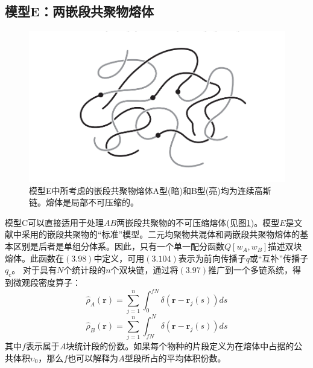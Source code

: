 \subsection{模型E：两嵌段共聚物熔体}

\begin{figure}[H]
	\centering   
	\includegraphics[width=12cm]{./figures/2.png}
	\caption{模型E中所考虑的嵌段共聚物熔体A型(暗)和B型(亮)均为连续高斯链。熔体是局部不可压缩的。}
	\label{模型E}
\end{figure}
模型C可以直接适用于处理$AB$两嵌段共聚物的不可压缩熔体(见图\ref{模型E})。模型$E$是文献中采用的嵌段共聚物的“标准”模型。二元均聚物共混体和两嵌段共聚物熔体的基本区别是后者是单组分体系。因此，只有一个单一配分函数$Q[w_{A},w_{B}]$描述双块熔体。此函数在$(3.98)$中定义，可用$(3.104)$表示为前向传播子$q$或“互补”传播子$q_{c}$。 对于具有$N$个统计段的$n$个双块链，通过将$(3.97)$推广到一个多链系统，得到微观段密度算子：\\
\begin{equation}
\hat{ \rho }_{A}(\mathbf{r})=\sum_{j=1}^{n} \int _{0}^{fN}  \delta (\mathbf{r}-\mathbf{r}_{j}(s))d s
\end{equation}
\begin{equation}
\hat{ \rho }_{B}(\mathbf{r})=\sum_{j=1}^{n} \int _{fN}^{N} \delta (\mathbf{r}-\mathbf{r}_{j}(s))d s 
\end{equation}
其中$f$表示属于$A$块统计段的份数。如果每个物种的片段定义为在熔体中占据的公共体积$\upsilon_0$，那么$f$也可以解释为$A$型段所占的平均体积份数。\\

